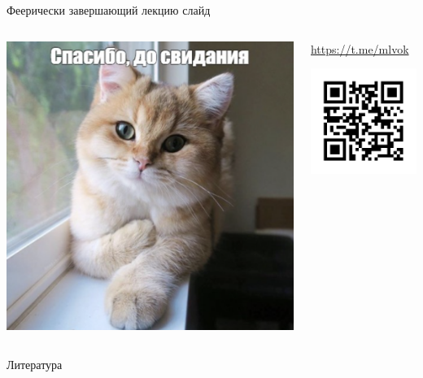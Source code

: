 \documentclass[11pt,aspectratio=169,handout]{beamer}
\begin{document}
\begin{frame}{Феерически завершающий лекцию слайд}

\begin{columns}
\begin{column}{0.45\textwidth}
   \begin{center}
                \includegraphics[scale=0.35]{images/bye.png}
   \end{center}
\end{column}
\begin{column}{0.45\textwidth}
   \begin{center}
                \url{https://t.me/mlvok}

                \includegraphics[scale=0.5]{images/tgqr.png}
   \end{center}
\end{column}
\end{columns}

\end{frame}

\begin{frame}[allowframebreaks]{Литература}




\end{frame}
\end{document}
